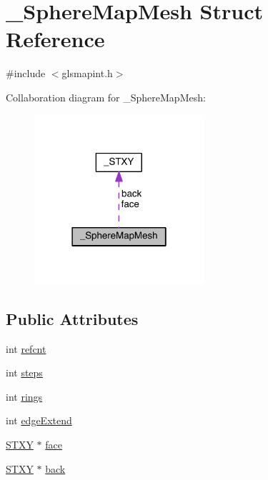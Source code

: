 \hypertarget{struct___sphere_map_mesh}{\section{\-\_\-\-Sphere\-Map\-Mesh Struct Reference}
\label{struct___sphere_map_mesh}
}


{\ttfamily \#include $<$glsmapint.\-h$>$}



Collaboration diagram for \-\_\-\-Sphere\-Map\-Mesh\-:
\nopagebreak
\begin{figure}[H]
\begin{center}
\leavevmode
\includegraphics[width=178pt]{struct___sphere_map_mesh__coll__graph}
\end{center}
\end{figure}
\subsection*{Public Attributes}
\begin{DoxyCompactItemize}
\item 
int \hyperlink{struct___sphere_map_mesh_a0c1c34900669d68aaf706a9e17fdeba8}{refcnt}
\item 
int \hyperlink{struct___sphere_map_mesh_aa2fec57e05a2fc00223c07992406fe7b}{steps}
\item 
int \hyperlink{struct___sphere_map_mesh_a4fee7062c54b6850d7400a1a2bd037dc}{rings}
\item 
int \hyperlink{struct___sphere_map_mesh_a9138869c8a44e8877b68bb1154a5a8ae}{edge\-Extend}
\item 
\hyperlink{glsmapint_8h_ac1c4fff4fc00c8cd3d4a318e152fce9e}{S\-T\-X\-Y} $\ast$ \hyperlink{struct___sphere_map_mesh_ab75ee81e8d0d201e0c32cd144de796a5}{face}
\item 
\hyperlink{glsmapint_8h_ac1c4fff4fc00c8cd3d4a318e152fce9e}{S\-T\-X\-Y} $\ast$ \hyperlink{struct___sphere_map_mesh_a2ea363cd5ab2463bc9c2c0de8d7f3811}{back}
\end{DoxyCompactItemize}


